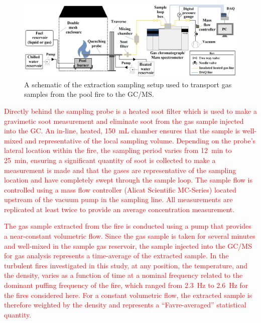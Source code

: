 \documentclass[12pt]{article}
\begin{document}
\begin{figure}
	\centering
\includegraphics[width=\textwidth,keepaspectratio]{Experimental_Setup.png}
	\caption[A schematic of the gas sampling procedure]{A schematic of the extraction sampling setup used to transport gas samples from the pool fire to the GC/MS.}
	\label{fig:Experimental_Setup}
\end{figure}

\textcolor{red}{Directly behind the sampling probe is a heated soot filter which is used to make a gravimetic soot measurement and eliminate soot from the gas sample injected into the GC. An in-line, heated, 150~mL chamber ensures that the sample is well-mixed and representative of the local sampling volume. Depending on the probe's lateral location within the fire, the sampling period varies from \SI{12}{min} to \SI{25}{min}, ensuring a significant quantity of soot is collected to make a measurement is made and that the gases are representative of the sampling location and have completely swept through the sample loop. The sample flow is controlled using a mass flow controller (Alicat Scientific MC-Series) located upstream of the vacuum pump in the sampling line. All measurements are replicated at least twice to provide an average concentration measurement.}

\textcolor{red}{The gas sample extracted from the fire is conducted using a pump that provides a near-constant volumetric flow. Since the gas sample is taken for several minutes and well-mixed in the sample gas reservoir, the sample injected into the GC/MS for gas analysis represents a time-average of the extracted sample. In the turbulent fires investigated in this study, at any position, the temperature, and the density, varies as a function of time at a nominal frequency related to the dominant puffing frequency of the fire, which ranged from \SI{2.3}{\hertz} to \SI{2.6}{\hertz} for the fires considered here. For a constant volumetric flow, the extracted sample is therefore weighted by the density and represents a “Favre-averaged” statistical quantity.}
\end{document}
